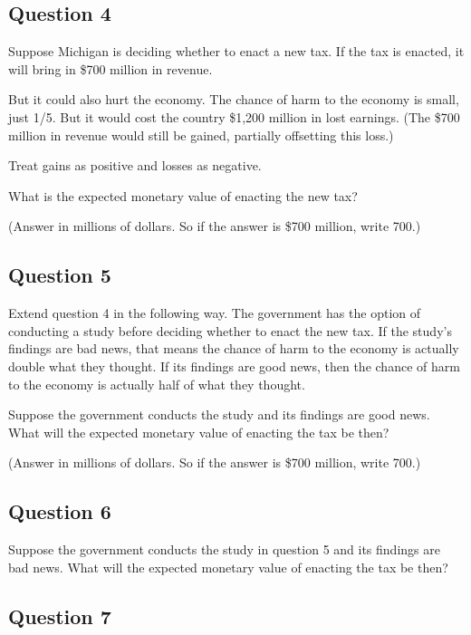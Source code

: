 \documentclass[
  11pt,
]{article}
\begin{document}
\hypertarget{question-4}{%
\subsection{Question 4}\label{question-4}}

Suppose Michigan is deciding whether to enact a new tax. If the tax is
enacted, it will bring in \$700 million in revenue.

But it could also hurt the economy. The chance of harm to the economy is
small, just 1/5. But it would cost the country \$1,200 million in lost
earnings. (The \$700 million in revenue would still be gained, partially
offsetting this loss.)

Treat gains as positive and losses as negative.

What is the expected monetary value of enacting the new tax?

(Answer in millions of dollars. So if the answer is \$700 million, write
700.)

\hypertarget{question-5}{%
\subsection{Question 5}\label{question-5}}

Extend question 4 in the following way. The government has the option of
conducting a study before deciding whether to enact the new tax. If the
study's findings are bad news, that means the chance of harm to the
economy is actually double what they thought. If its findings are good
news, then the chance of harm to the economy is actually half of what
they thought.

Suppose the government conducts the study and its findings are good
news. What will the expected monetary value of enacting the tax be then?

(Answer in millions of dollars. So if the answer is \$700 million, write
700.)

\hypertarget{question-6}{%
\subsection{Question 6}\label{question-6}}

Suppose the government conducts the study in question 5 and its findings
are bad news. What will the expected monetary value of enacting the tax
be then?

\hypertarget{question-7}{%
\subsection{Question 7}\label{question-7}}
\end{document}
